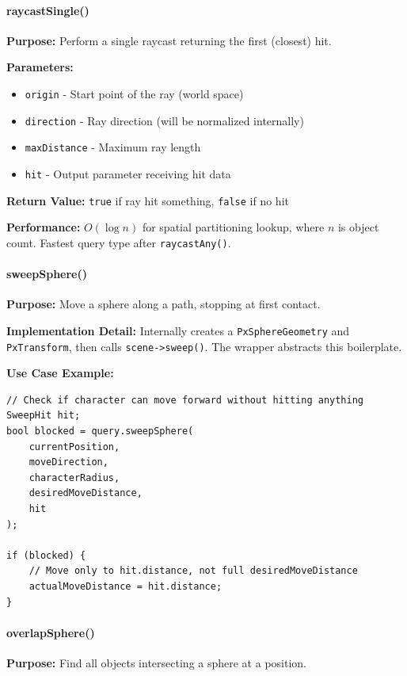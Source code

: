\paragraph{raycastSingle()}

\textbf{Purpose:} Perform a single raycast returning the first (closest) hit.

\textbf{Parameters:}
\begin{itemize}
    \item \texttt{origin} - Start point of the ray (world space)
    \item \texttt{direction} - Ray direction (will be normalized internally)
    \item \texttt{maxDistance} - Maximum ray length
    \item \texttt{hit} - Output parameter receiving hit data
\end{itemize}

\textbf{Return Value:} \texttt{true} if ray hit something, \texttt{false} if no hit

\textbf{Performance:} $O(\log n)$ for spatial partitioning lookup, where $n$ is object count. Fastest query type after \texttt{raycastAny()}.

\paragraph{sweepSphere()}

\textbf{Purpose:} Move a sphere along a path, stopping at first contact.

\textbf{Implementation Detail:} Internally creates a \texttt{PxSphereGeometry} and \texttt{PxTransform}, then calls \texttt{scene->sweep()}. The wrapper abstracts this boilerplate.

\textbf{Use Case Example:}
\begin{lstlisting}[style=cpp]
// Check if character can move forward without hitting anything
SweepHit hit;
bool blocked = query.sweepSphere(
    currentPosition,
    moveDirection,
    characterRadius,
    desiredMoveDistance,
    hit
);

if (blocked) {
    // Move only to hit.distance, not full desiredMoveDistance
    actualMoveDistance = hit.distance;
}
\end{lstlisting}

\paragraph{overlapSphere()}

\textbf{Purpose:} Find all objects intersecting a sphere at a position.

